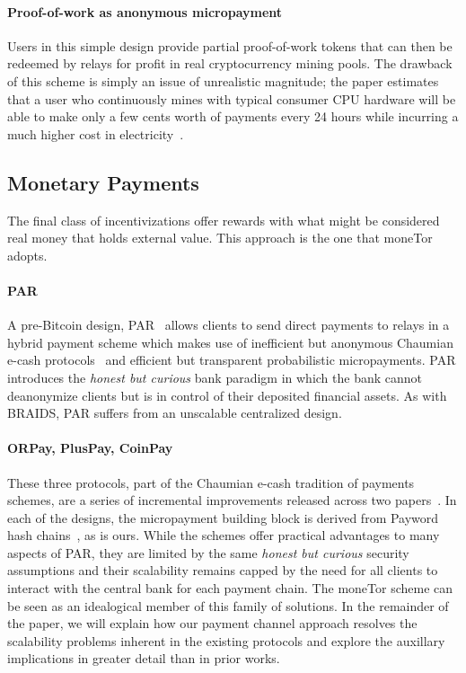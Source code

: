 \paragraph*{Proof-of-work as anonymous micropayment} Users in this simple design
provide partial proof-of-work tokens that can then be redeemed by relays for
profit in real cryptocurrency mining pools. The drawback of this scheme is
simply an issue of unrealistic magnitude; the paper estimates that a user who
continuously mines with typical consumer CPU hardware will be able to make only
a few cents worth of payments every 24 hours while incurring a much higher cost
in electricity~\cite{biryukov2015proof}.
\subsection{Monetary Payments}
\label{sub:monetary}

The final class of incentivizations offer rewards with what might be considered
real money that holds external value. This approach is the one that moneTor adopts.

\paragraph*{PAR} A pre-Bitcoin design, PAR~\cite{androulaki2008payment}
allows clients to send direct payments to relays in a hybrid payment scheme
which makes use of inefficient but anonymous Chaumian e-cash
protocols~\cite{chaum1988untraceable} and efficient but transparent
probabilistic micropayments. PAR introduces the \emph{honest but curious} bank
paradigm in which the bank cannot deanonymize clients but is in control of their
deposited financial assets. As with BRAIDS, PAR suffers from an unscalable
centralized design.

\paragraph*{ORPay, PlusPay, CoinPay} These three protocols, part of the
Chaumian e-cash tradition of payments schemes, are a series of incremental
improvements released across two papers~\cite{chen2009xpay,
  carbunar2012tipping}. In each of the designs, the micropayment building block
is derived from Payword hash chains~\cite{rivest1996payword}, as is ours. While
the schemes offer practical advantages to many aspects of PAR, they are limited
by the same \emph{honest but curious} security assumptions and their scalability
remains capped by the need for all clients to interact with the central bank for
each payment chain. The moneTor scheme can be seen as an idealogical member of
this family of solutions. In the remainder of the paper, we will explain how our
payment channel approach resolves the scalability problems inherent in the
existing protocols and explore the auxillary implications in greater detail than
in prior works.

